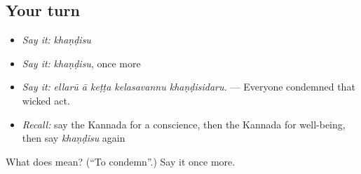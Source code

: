 \subsection*{Your turn}
\begin{itemize}
\raggedright
  \item \emph{Say it:} \emph{khaṇḍisu}
  \item \emph{Say it:} \emph{khaṇḍisu}, once more
  \item \emph{Say it:} \emph{ellarū ā keṭṭa kelasavannu khaṇḍisidaru.} — Everyone condemned that wicked act.
  \item \emph{Recall:} say the Kannada for a conscience, then the Kannada for well-being, then say \emph{khaṇḍisu} again
\end{itemize}

\begin{tcolorbox}[breakable,colback=teal!4,colframe=teal!35!black,title={Before you move on}]
What does  mean? (\textquotedblleft{}To condemn\textquotedblright{}.) Say it once more.
\end{tcolorbox}
